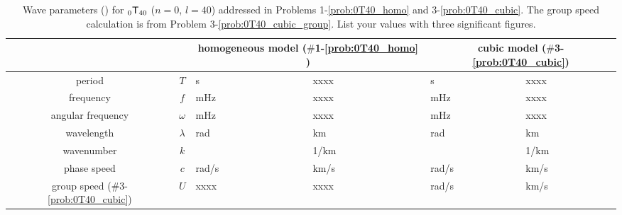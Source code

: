 \documentclass[11pt,titlepage,fleqn]{article}
\newcommand{\tnl}[2]{\mbox{$_{#1}\ssT_{#2}$}}
\newcommand{\blank}{xxxx}
\begin{document}
\begin{table}
\caption[]
{{
Wave parameters () for \tnl{0}{40} ($n=0$, $l=40$) addressed in Problems 1-\ref{prob:0T40_homo} and 3-\ref{prob:0T40_cubic}.
The group speed calculation is from Problem 3-\ref{prob:0T40_cubic_group}.
List your values with three significant figures.
\label{tab:eigfun}
}}
\begin{spacing}{1.5}
\hspace{-1.0cm}
\begin{tabular}{||c|c|l|l||l|l||}
\hline
& & \multicolumn{2}{c||}{homogeneous model ($\#$1-\ref{prob:0T40_homo} )} & \multicolumn{2}{c||}{cubic model ($\#$3-\ref{prob:0T40_cubic})}  \\ \hline\hline
period & $T$ & \hspace{2cm}s & \blank & \hspace{2cm}s & \blank \\  \hline
frequency & $f$ & \hspace{2cm}mHz & \blank & \hspace{2cm}mHz & \blank \\  \hline
angular frequency & $\omega$ & \hspace{2cm}mHz & \blank  & \hspace{2cm}mHz & \blank \\  \hline
wavelength & $\lambda$ & \hspace{2cm}rad & \hspace{2cm}km & \hspace{2cm}rad & \hspace{2cm}km \\  \hline
wavenumber & $k$ & \hspace{2cm} & \hspace{2cm}1/km & \hspace{2cm} & \hspace{2cm}1/km \\  \hline
phase speed & $c$ & \hspace{2cm}rad/s & \hspace{2cm}km/s & \hspace{2cm}rad/s & \hspace{2cm}km/s \\  \hline\hline
group speed ($\#$3-\ref{prob:0T40_cubic}) & $U$ & \blank & \blank & \hspace{2cm}rad/s & \hspace{2cm}km/s \\  \hline
\hline
\end{tabular}
\end{spacing}
\end{table}
\end{document}
